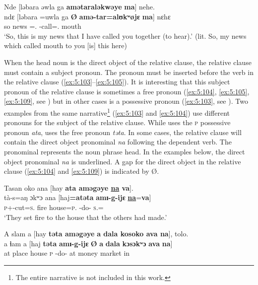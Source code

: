 \ea \label{ex:5:102}
Nde  [ləbara  əwla  ga \textbf{amətaraləkwəye}  \textbf{ma}]  nehe.\\
\gll  ndɛ  [ləbara  =uwla    ga  \textbf{Ø} \textbf{amə-tar}\textbf{=alʊkʷøjɛ}  \textbf{ma}]  nɛhɛ\\
      so  news  ={\oneS}.{\POSS}  {\ADJ}  { }    {\DEP}-call={\twoP}.{\IO}    mouth  {\DEM}\\
\glt  ‘So, this is my news that I have called you together (to hear).’ (lit. So, my news which called mouth to you [is] this here)
\z

When the head noun is the direct object of the relative clause, the relative clause must contain a subject pronoun. The pronoun  must be inserted before the verb in the relative clause (\ref{ex:5:103}--\ref{ex:5:105}). It is interesting that this subject pronoun of the relative clause is sometimes a free pronoun (\ref{ex:5:104}, \ref{ex:5:105}, \ref{ex:5:109}, see ) but in other cases is a possessive pronoun (\ref{ex:5:103}, see ).  Two examples from the same narrative\footnote{The entire narrative is not included in this work.} (\ref{ex:5:103} and \ref{ex:5:104}) use different pronouns for the subject of the relative clause. While  uses the \textsc{p} possessive pronoun \textit{ata},  uses the free pronoun \textit{təta}. In some cases, the relative clause will contain the direct object pronominal \textit{na} following the dependent verb. The \DO pronominal represents the noun phrase head. In the examples below, the direct object pronominal \textit{na} is underlined. A gap for the direct object in the relative clause (\ref{ex:5:104} and \ref{ex:5:109}) is indicated by {Ø}.  

\ea \label{ex:5:103}
Tasan  oko  ana  [hay  \textbf{ata  aməgəye \underline{na} va}].\\
\gll  tà-s=aŋ            ɔkʷɔ   ana    [haj\textbf{=atəta}     \textbf{amɪ-g-ijɛ} \textbf{\underline{na}}=\textbf{va}]\\
      \textsc{p}+{\PFV}-cut=\textsc{s}.{\IO}  fire   {\DAT}   house=\textsc{p}.{\POSS}   {\DEP}-do-{\CL}      \textsc{s}.{\DO}={\PRF}\\
\glt  ‘They set fire to the house that the others had made.’
\z

\ea \label{ex:5:104}
A  slam  a  [hay  \textbf{təta aməgəye}  \textbf{a  dala  kosoko  ava na}],  tolo.\\
\gll  a  ɬam  a  [haj  \textbf{təta}  \textbf{amɪ-g-ijɛ}   \textbf{Ø}  \textbf{a}  \textbf{dala}  \textbf{kɔsɔkʷɔ}  \textbf{ava}   \textbf{na}]\\
      at   place  {\GEN}  house  \textsc{p}  {\DEP}-do-{\CL}  { }  {at}  money  market  in  {\PSP}\\
      

